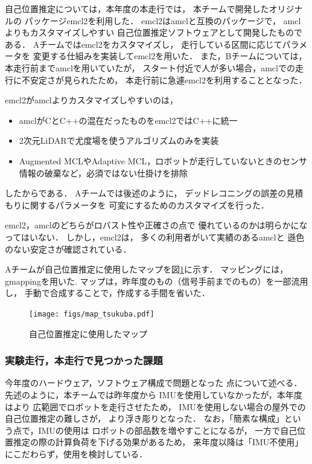 \documentclass[twocolumn,9pt]{jsproceedings}
\begin{document}
自己位置推定については，本年度の本走行では，
本チームで開発したオリジナルの
パッケージemcl2\cite{emcl2}を利用した．
emcl2はamcl\cite{amcl}と互換のパッケージで，
amclよりもカスタマイズしやすい
自己位置推定ソフトウェアとして開発したものである．
Aチームではemcl2をカスタマイズし，
走行している区間に応じてパラメータを
変更する仕組みを実装してemcl2を用いた．
また，Bチームについては，本走行前までamclを用いていたが，
スタート付近で人が多い場合，amclでの走行に不安定さが見られたため，
本走行前に急遽emcl2を利用することとなった．


emcl2がamclよりカスタマイズしやすいのは，
\begin{itemize}
	\item amclがCとC++の混在だったものをemcl2ではC++に統一
	\item 2次元LiDARで尤度場を使うアルゴリズムのみを実装
	\item Augmented MCL\cite{gutmann2002}やAdaptive MCL\cite{fox2003}，ロボットが走行していないときのセンサ情報の破棄など，必須ではない仕掛けを排除
\end{itemize}
したからである．
Aチームでは後述のように，
デッドレコニングの誤差の見積もりに関するパラメータを
可変にするためのカスタマイズを行った．

emcl2，amclのどちらがロバスト性や正確さの点で
優れているのかは明らかになってはいない．
しかし，emcl2は，
多くの利用者がいて実績のあるamclと
遜色のない安定さが確認されている．



Aチームが自己位置推定に使用したマップを図\ref{fig:map_tsukuba}に示す．
マッピングには，gmapping\cite{gmapping}を用いた. 
マップは，昨年度のもの（信号手前までのもの）を一部流用し，
手動で合成することで，作成する手間を省いた．



\begin{figure}[h]
  \begin{center}
    \texttt{[image: figs/map\_tsukuba.pdf]}
    \caption{自己位置推定に使用したマップ}
    \label{fig:map_tsukuba}
  \end{center}
\end{figure}

\subsubsection{実験走行，本走行で見つかった課題}

今年度のハードウェア，ソフトウェア構成で問題となった
点について述べる．先述のように，本チームでは昨年度から
IMUを使用していなかったが，本年度はより
広範囲でロボットを走行させたため，
IMUを使用しない場合の屋外での自己位置推定の難しさが，
より浮き彫りとなった．
なお，「簡素な構成」という点で，IMUの使用は
ロボットの部品数を増やすことになるが，
一方で自己位置推定の際の計算負荷を下げる効果があるため，
来年度以降は「IMU不使用」にこだわらず，使用を検討している．
\end{document}
